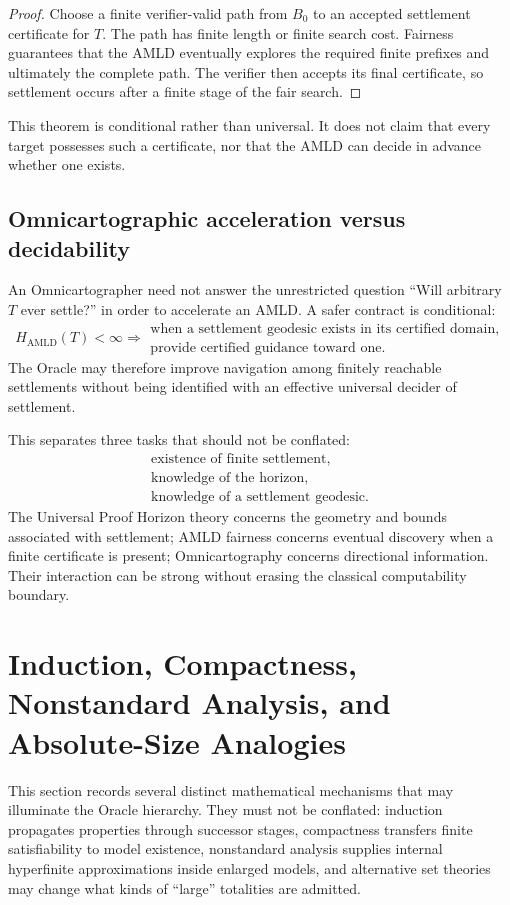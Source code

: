 \documentclass[11pt]{article}
\begin{document}
\begin{proof}
Choose a finite verifier-valid path from $B_0$ to an accepted settlement certificate for $T$. The path has finite length or finite search cost. Fairness guarantees that the AMLD eventually explores the required finite prefixes and ultimately the complete path. The verifier then accepts its final certificate, so settlement occurs after a finite stage of the fair search.
\end{proof}

This theorem is conditional rather than universal. It does not claim that every target possesses such a certificate, nor that the AMLD can decide in advance whether one exists.

\subsection{Omnicartographic acceleration versus decidability}
An Omnicartographer need not answer the unrestricted question ``Will arbitrary $T$ ever settle?'' in order to accelerate an AMLD. A safer contract is conditional:
\[
H_{\mathrm{AMLD}}(T)<\infty
\Longrightarrow
\begin{array}{l}
\text{when a settlement geodesic exists in its certified domain,}\\
\text{provide certified guidance toward one.}
\end{array}
\]
The Oracle may therefore improve navigation among finitely reachable settlements without being identified with an effective universal decider of settlement.

This separates three tasks that should not be conflated:
\[
\begin{array}{c}
\text{existence of finite settlement},\\[0.2em]
\text{knowledge of the horizon},\\[0.2em]
\text{knowledge of a settlement geodesic}.
\end{array}
\]
The Universal Proof Horizon theory concerns the geometry and bounds associated with settlement; AMLD fairness concerns eventual discovery when a finite certificate is present; Omnicartography concerns directional information. Their interaction can be strong without erasing the classical computability boundary.

\section{Induction, Compactness, Nonstandard Analysis, and Absolute-Size Analogies}
This section records several distinct mathematical mechanisms that may illuminate the Oracle hierarchy. They must not be conflated: induction propagates properties through successor stages, compactness transfers finite satisfiability to model existence, nonstandard analysis supplies internal hyperfinite approximations inside enlarged models, and alternative set theories may change what kinds of ``large'' totalities are admitted.
\end{document}
